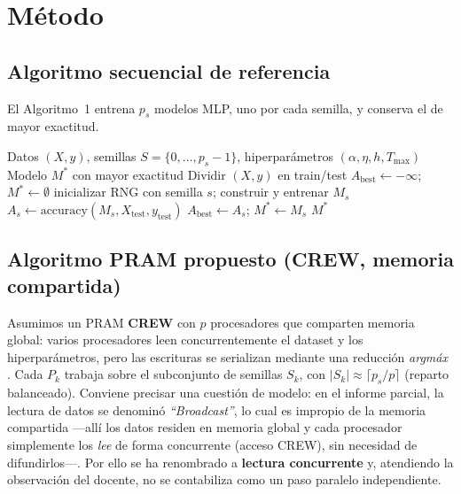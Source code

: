\documentclass[11pt,a4paper]{article}
\begin{document}
\section{Método}

\subsection{Algoritmo secuencial de referencia}
El Algoritmo~1 entrena $p_s$ modelos MLP, uno por cada semilla, y conserva el de
mayor exactitud.

\begin{algorithm}[H]
\caption{Entrenamiento secuencial de múltiples MLP con distintas semillas}
\label{alg:seq}
\begin{algorithmic}[1]
\Require Datos $(X,y)$, semillas $S=\{0,\dots,p_s{-}1\}$, hiperparámetros $(\alpha,\eta,h,T_{\max})$
\Ensure Modelo $M^\ast$ con mayor exactitud
\State Dividir $(X,y)$ en train/test 
\State $A_{\text{best}}\gets -\infty$;\; $M^\ast\gets \emptyset$
  \State inicializar RNG con semilla $s$;\; construir y entrenar $M_s$
  \State $A_s\gets \mathrm{accuracy}(M_s,X_{\text{test}},y_{\text{test}})$
   $A_{\text{best}}\gets A_s$;\; $M^\ast\gets M_s$ \EndIf
\EndFor
\State \Return $M^\ast$
\end{algorithmic}
\end{algorithm}

\subsection{Algoritmo PRAM propuesto (CREW, memoria compartida)}
\label{sec:pram}

Asumimos un PRAM \textbf{CREW} con $p$ procesadores que comparten memoria global:
varios procesadores leen concurrentemente el dataset y los hiperparámetros, pero
las escrituras se serializan mediante una reducción \emph{arg\-máx}
\cite{bennun2019}. Cada $P_k$ trabaja sobre el subconjunto de semillas $S_k$, con
$|S_k|\approx\lceil p_s/p\rceil$ (reparto balanceado). Conviene precisar una
cuestión de modelo: en el informe parcial, la lectura de datos se denominó
\emph{``Broadcast''}, lo cual es impropio de la memoria compartida ---allí los
datos residen en memoria global y cada procesador simplemente los \emph{lee} de
forma concurrente (acceso CREW), sin necesidad de difundirlos---. Por ello se ha
renombrado a \textbf{lectura concurrente} y, atendiendo la observación del
docente, no se contabiliza como un paso paralelo independiente.
\end{document}
